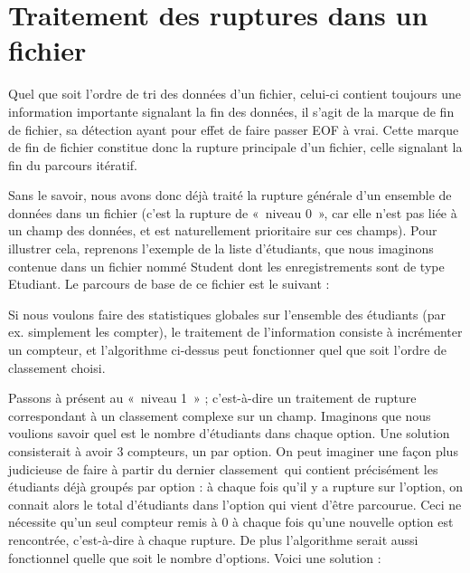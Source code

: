 \section{Traitement des ruptures dans un fichier}

Quel que soit l’ordre de tri des données d’un fichier, celui-ci contient
toujours une information importante signalant la fin des données, il
s’agit de la marque de fin de fichier, sa détection ayant pour effet de
faire passer EOF à vrai. Cette marque de fin de fichier constitue donc
la rupture principale d’un fichier, celle signalant la fin du parcours
itératif.

Sans le savoir, nous avons donc déjà traité la rupture générale d’un
ensemble de données dans un fichier (c’est la rupture de «~niveau 0~»,
car elle n’est pas liée à un champ des données, et est naturellement
prioritaire sur ces champs). Pour illustrer cela, reprenons l’exemple
de la liste d’étudiants, que nous imaginons contenue dans un fichier
nommé Student dont les enregistrements sont de type Etudiant. Le
parcours de base de ce fichier est le suivant :


Si nous voulons faire des statistiques globales sur l’ensemble des
étudiants (par ex. simplement les compter), le traitement de
l’information consiste à incrémenter un compteur, et l’algorithme
ci-dessus peut fonctionner quel que soit l’ordre de classement choisi.

Passons à présent au «~niveau 1~» ; c’est-à-dire un traitement de
rupture correspondant à un classement complexe sur un champ. Imaginons
que nous voulions savoir quel est le nombre d’étudiants dans chaque
option. Une solution consisterait à avoir 3 compteurs, un par option.
On peut imaginer une façon plus judicieuse de faire à partir du dernier
classement~qui contient précisément les étudiants déjà groupés par
option : à chaque fois qu’il y a rupture sur l’option, on connait alors
le total d’étudiants dans l’option qui vient d’être parcourue. Ceci ne
nécessite qu’un seul compteur remis à 0 à chaque fois qu’une nouvelle
option est rencontrée, c’est-à-dire à chaque rupture. De plus
l’algorithme serait aussi fonctionnel quelle que soit le nombre
d’options. Voici une solution : 

